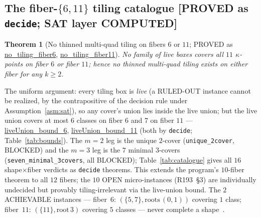 \documentclass[11pt,a4paper]{article}
\newtheorem{theorem}{Theorem}
\theoremstyle{definition}
\begin{document}
\subsection{The fiber-\texorpdfstring{$\{6,11\}$}{\{6,11\}} tiling catalogue [PROVED as \texttt{decide}; SAT layer COMPUTED]}

\begin{theorem}[No thinned multi-quad tiling on fibers $6$ or $11$;
  PROVED as \url{no_tiling_fiber6}, \url{no_tiling_fiber11}]
  \label{thm:notiling}
  No family of live boxes covers all $11$ $\kappa$-points on fiber $6$
  or fiber $11$; hence no thinned multi-quad tiling exists on either
  fiber for any $k\ge2$.
\end{theorem}
The uniform argument: every tiling box is \emph{live} (a RULED-OUT
instance cannot be realized, by the contrapositive of the decision rule
under Assumption~\ref{asm:sat}), so any cover's union lies inside the
live union; but the live union covers at most $6$ classes on fiber $6$
and $7$ on fiber $11$ ---
\url{liveUnion_bound_6}, \url{liveUnion_bound_11} (both by
\texttt{decide}; Table~\ref{tab:bounds}). The $m=2$ leg is the unique
$2$-cover (\texttt{unique\_2cover}, BLOCKED) and the $m=3$ leg is the
$7$ minimal $3$-covers (\texttt{seven\_minimal\_3covers}, all BLOCKED);
Table~\ref{tab:catalogue} gives all $16$ shape$\times$fiber verdicts as
\texttt{decide} theorems. This extends the program's $10$-fiber theorem
to all $12$ fibers; the $10$ OPEN micro-instances (R193~\S3) are
individually undecided but provably tiling-irrelevant via the live-union
bound. The $2$ ACHIEVABLE instances --- fiber~$6$: $(\{5,7\},\mathrm{roots}
\,(0,1))$ covering $1$ class; fiber~$11$: $(\{11\},\mathrm{root}\,3)$
covering $5$ classes --- never complete a shape~\cite{D193,D202}.
\end{document}
